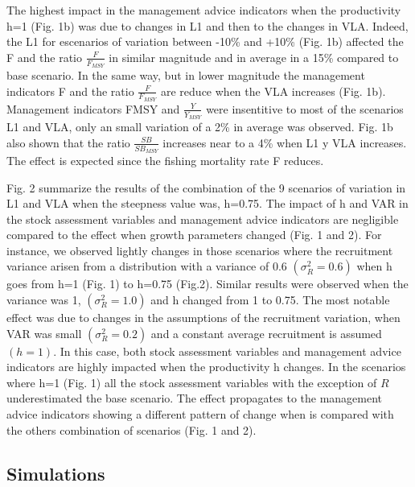 \documentclass[11pt,letterpaper,]{article}
\begin{document}
The highest impact in the management advice indicators when the
productivity h=1 (Fig. 1b) was due to changes in L1 and then to the
changes in VLA. Indeed, the L1 for escenarios of variation between -10\%
and +10\% (Fig. 1b) affected the F and the ratio \(\frac{F}{F_{MSY}}\)
in similar magnitude and in average in a 15\% compared to base scenario.
In the same way, but in lower magnitude the management indicators F and
the ratio \(\frac{F}{F_{MSY}}\) are reduce when the VLA increases (Fig.
1b). Management indicators FMSY and \(\frac{Y}{Y_{MSY}}\) were
insentitive to most of the scenarios L1 and VLA, only an small variation
of a 2\% in average was observed. Fig. 1b also shown that the ratio
\(\frac{SB}{SB_{MSY}}\) increases near to a 4\% when L1 y VLA increases.
The effect is expected since the fishing mortality rate F reduces.

Fig. 2 summarize the results of the combination of the 9 scenarios of
variation in L1 and VLA when the steepness value was, h=0.75. The impact
of h and VAR in the stock assessment variables and management advice
indicators are negligible compared to the effect when growth parameters
changed (Fig. 1 and 2). For instance, we observed lightly changes in
those scenarios where the recruitment variance arisen from a
distribution with a variance of 0.6 \((\sigma^2_R=0.6)\) when h goes
from h=1 (Fig. 1) to h=0.75 (Fig.2). Similar results were observed when
the variance was 1, \((\sigma^2_R=1.0)\) and h changed from 1 to 0.75.
The most notable effect was due to changes in the assumptions of the
recruitment variation, when VAR was small \((\sigma^2_R=0.2)\) and a
constant average recruitment is assumed \((h=1)\). In this case, both
stock assessment variables and management advice indicators are highly
impacted when the productivity h changes. In the scenarios where h=1
(Fig. 1) all the stock assessment variables with the exception of \(R\)
underestimated the base scenario. The effect propagates to the
management advice indicators showing a different pattern of change when
is compared with the others combination of scenarios (Fig. 1 and 2).

\subsection{Simulations}\label{simulations}
\end{document}

